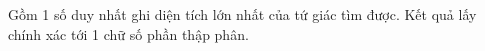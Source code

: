 Gồm 1 số duy nhất ghi diện tích lớn nhất của tứ giác tìm được. Kết quả lấy chính xác tới 1 chữ số phần thập phân.